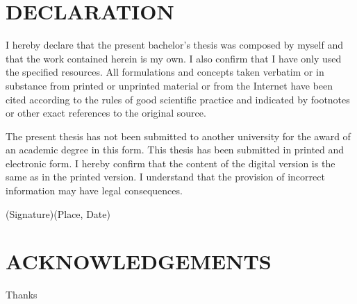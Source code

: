 \documentclass[12pt,twoside]{report}
\numberwithin{equation}{subsection}
\begin{document}
\chapter*{DECLARATION}


I hereby declare that the present bachelor's thesis was composed by myself and that the work contained herein is my own. I also confirm that I have only used the specified resources. All formulations and concepts taken verbatim or in substance from printed or unprinted material or from the Internet have been cited according to the rules of good
scientific practice and indicated by footnotes or other exact references to the original source.

\vline

\noindent The present thesis has not been submitted to another university for the award of an academic
degree in this form. This thesis has been submitted in printed and electronic form. I hereby
confirm that the content of the digital version is the same as in the printed version.
I understand that the provision of incorrect information may have legal consequences.
\vfill

(Signature)\hfill (Place, Date)
\vspace{8.5cm}


\chapter*{ACKNOWLEDGEMENTS}
Thanks 

\tableofcontents
\listoffigures 
\listoftables














\printbibliography
\end{document}
